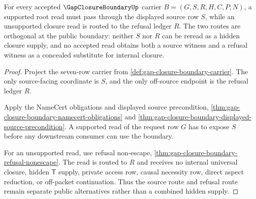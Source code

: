 \begin{theorem}
\label{thm:gap-closure-boundary-source-refusal-orthogonality}
For every accepted $\GapClosureBoundaryUp$ carrier $B=(G,S,R,H,C,P,N)$, a supported root read must pass through the displayed source row $S$, while an unsupported closure read is routed to the refusal ledger $R$. The two routes are orthogonal at the public boundary: neither $S$ nor $R$ can be reread as a hidden closure supply, and no accepted read obtains both a source witness and a refusal witness as a concealed substitute for internal closure.
\end{theorem}
\begin{proof}
Project the seven-row carrier from \autoref{def:gap-closure-boundary-carrier}. The only source-facing coordinate is $S$, and the only off-source endpoint is the refusal ledger $R$.

Apply the NameCert obligations and displayed source precondition, \autoref{thm:gap-closure-boundary-namecert-obligations} and \autoref{thm:gap-closure-boundary-displayed-source-precondition}. A supported read of the request row $G$ has to expose $S$ before any downstream consumer can use the boundary.

For an unsupported read, use refusal non-escape, \autoref{thm:gap-closure-boundary-refusal-nonescape}. The read is routed to $R$ and receives no internal universal closure, hidden $\mathsf{T}$ supply, private access row, causal necessity row, direct aspect reduction, or off-packet continuation. Thus the source route and refusal route remain separate public alternatives rather than a combined hidden supply.
\end{proof}

